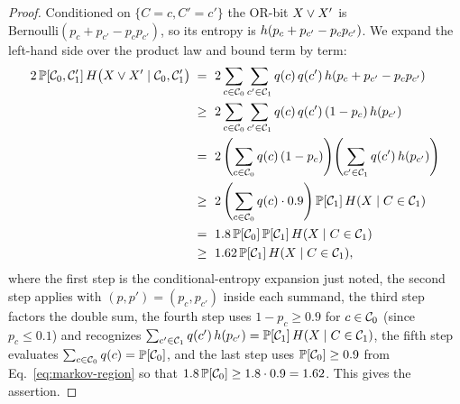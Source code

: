 \begin{proof}
Conditioned on $\{C = c, C' = c'\}$ the OR-bit $X \vee X'$ is
$\mathrm{Bernoulli}(p_c + p_{c'} - p_c p_{c'})$, so its entropy is
$h(p_c + p_{c'} - p_c p_{c'})$. We expand the left-hand side over the product
law and bound term by term:
\begin{align*}
2\,\mathbb{P}[\mathcal{C}_0, \mathcal{C}_1']\, H\bigl(X \vee X' \mid \mathcal{C}_0, \mathcal{C}_1'\bigr)
\;=\; & ~ 2 \sum_{c \in \mathcal{C}_0}\sum_{c' \in \mathcal{C}_1} q(c)\,q(c')\,h(p_c + p_{c'} - p_c p_{c'}) \\
\;\ge\; & ~ 2 \sum_{c \in \mathcal{C}_0}\sum_{c' \in \mathcal{C}_1} q(c)\,q(c')\,(1 - p_c)\,h(p_{c'}) \\
\;=\; & ~ 2 \left(\sum_{c \in \mathcal{C}_0} q(c)\,(1 - p_c)\right)\!\left(\sum_{c' \in \mathcal{C}_1} q(c')\,h(p_{c'})\right) \\
\;\ge\; & ~ 2 \left(\sum_{c \in \mathcal{C}_0} q(c)\cdot 0.9\right) \mathbb{P}[\mathcal{C}_1]\,H(X \mid C \in \mathcal{C}_1) \\
\;=\; & ~ 1.8\,\mathbb{P}[\mathcal{C}_0]\,\mathbb{P}[\mathcal{C}_1]\,H(X \mid C \in \mathcal{C}_1) \\
\;\ge\; & ~ 1.62\,\mathbb{P}[\mathcal{C}_1]\,H(X \mid C \in \mathcal{C}_1),
\end{align*}
where the first step is the conditional-entropy expansion just noted, the second
step applies  with $(p, p') = (p_c, p_{c'})$ inside each
summand, the third step factors the double sum, the fourth step uses
$1 - p_c \ge 0.9$ for $c \in \mathcal{C}_0$ (since $p_c \le 0.1$) and recognizes
$\sum_{c' \in \mathcal{C}_1} q(c')\,h(p_{c'}) = \mathbb{P}[\mathcal{C}_1]\,H(X \mid C \in \mathcal{C}_1)$, the
fifth step evaluates $\sum_{c \in \mathcal{C}_0} q(c) = \mathbb{P}[\mathcal{C}_0]$, and the last step uses
$\mathbb{P}[\mathcal{C}_0] \ge 0.9$ from Eq.~\eqref{eq:markov-region} so that $1.8\,\mathbb{P}[\mathcal{C}_0] \ge 1.8 \cdot 0.9 = 1.62$.
This gives the assertion.
\end{proof}
